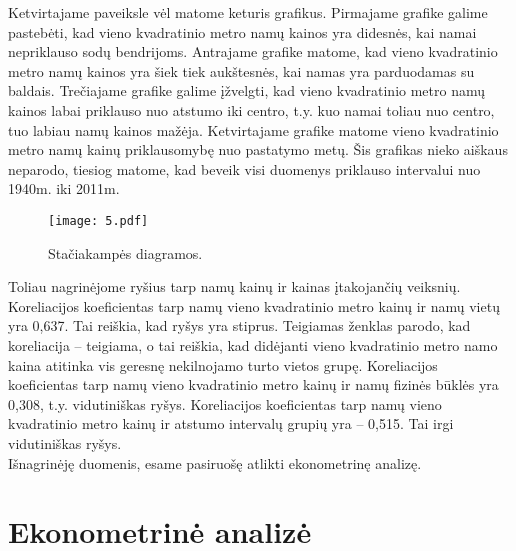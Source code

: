 \documentclass[a4paper]{article}
\begin{document}
\hspace*{0,52cm}Ketvirtajame paveiksle vėl matome keturis grafikus. Pirmajame grafike galime pastebėti, kad vieno kvadratinio metro namų kainos yra didesnės, kai namai nepriklauso sodų bendrijoms. Antrajame grafike matome, kad vieno kvadratinio metro namų kainos yra šiek tiek aukštesnės, kai namas yra parduodamas su baldais. Trečiajame grafike galime įžvelgti, kad vieno kvadratinio metro namų kainos labai priklauso nuo atstumo iki centro, t.y. kuo namai toliau nuo centro, tuo labiau namų kainos mažėja. Ketvirtajame grafike matome vieno kvadratinio metro namų kainų priklausomybę nuo pastatymo metų. Šis grafikas nieko aiškaus neparodo, tiesiog matome, kad beveik visi duomenys priklauso intervalui nuo 1940m. iki 2011m.
\begin{figure}[H]
  \caption{Stačiakampės diagramos.}
  \centering
    \texttt{[image: 5.pdf]}
\end{figure}

\hspace*{0,52cm}Toliau nagrinėjome ryšius tarp namų kainų ir kainas įtakojančių veiksnių. Koreliacijos koeficientas tarp namų vieno kvadratinio metro kainų ir namų vietų yra 0,637. Tai reiškia, kad ryšys yra stiprus. Teigiamas ženklas parodo, kad koreliacija -- teigiama, o tai reiškia, kad didėjanti vieno kvadratinio metro namo kaina atitinka vis geresnę nekilnojamo turto vietos grupę. Koreliacijos koeficientas tarp namų vieno kvadratinio metro kainų ir namų fizinės būklės yra 0,308, t.y. vidutiniškas ryšys. Koreliacijos koeficientas tarp namų vieno kvadratinio metro kainų ir atstumo intervalų grupių yra -- 0,515. Tai irgi vidutiniškas ryšys.\\
\hspace*{0,52cm}Išnagrinėję duomenis, esame pasiruošę atlikti ekonometrinę analizę.

\section{Ekonometrinė analizė}
\end{document}
